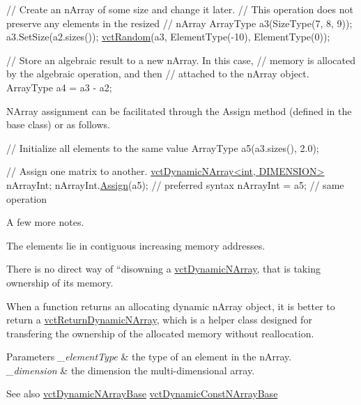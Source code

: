 \begin{DoxyEnumerate}
\begin{DoxyCode}
\textcolor{comment}{// Create an nArray of some size and change it later.}
\textcolor{comment}{// This operation does not preserve any elements in the resized}
\textcolor{comment}{// nArray}
ArrayType a3(SizeType(7, 8, 9));
a3.SetSize(a2.sizes());
\hyperlink{group__cisst_vector_ga0d25660a2dc6ef9c093f6f6b2804d2d0}{vctRandom}(a3, ElementType(-10), ElementType(0));

\textcolor{comment}{// Store an algebraic result to a new nArray.  In this case,}
\textcolor{comment}{// memory is allocated by the algebraic operation, and then}
\textcolor{comment}{// attached to the nArray object.}
ArrayType a4 = a3 - a2;
\end{DoxyCode}
 
\item N\+Array assignment can be facilitated through the Assign method (defined in the base class) or as follows. 
\begin{DoxyCode}
\textcolor{comment}{// Initialize all elements to the same value}
ArrayType a5(a3.sizes(), 2.0);

\textcolor{comment}{// Assign one matrix to another.}
\hyperlink{classvct_dynamic_n_array}{vctDynamicNArray<int, DIMENSION>} nArrayInt;
nArrayInt.\hyperlink{classvct_dynamic_n_array_base_ab9c91c7f9a6c59ba68d3467c26853215}{Assign}(a5); \textcolor{comment}{// preferred syntax}
nArrayInt = a5; \textcolor{comment}{// same operation}
\end{DoxyCode}
 
\end{DoxyEnumerate}

A few more notes. 
\begin{DoxyItemize}
\item The elements lie in contiguous increasing memory addresses. 
\item There is no direct way of ``disowning\textquotesingle{}\textquotesingle{} a \hyperlink{classvct_dynamic_n_array}{vct\+Dynamic\+N\+Array}, that is taking ownership of its memory. 
\item When a function returns an allocating dynamic n\+Array object, it is better to return a \hyperlink{classvct_return_dynamic_n_array}{vct\+Return\+Dynamic\+N\+Array}, which is a helper class designed for transfering the ownership of the allocated memory without reallocation. 
\end{DoxyItemize}


\begin{DoxyParams}{Parameters}
{\em \+\_\+element\+Type} & the type of an element in the n\+Array.\\
\hline
{\em \+\_\+dimension} & the dimension the multi-\/dimensional array.\\
\hline
\end{DoxyParams}
\begin{DoxySeeAlso}{See also}
\hyperlink{classvct_dynamic_n_array_base}{vct\+Dynamic\+N\+Array\+Base} \hyperlink{classvct_dynamic_const_n_array_base}{vct\+Dynamic\+Const\+N\+Array\+Base} 
\end{DoxySeeAlso}


